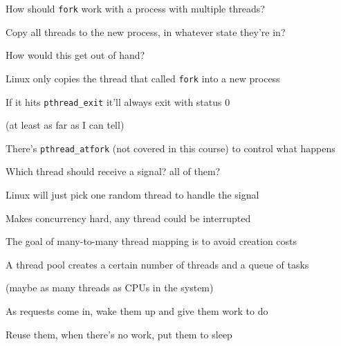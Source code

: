   \begin{slide}


    How should \texttt{fork} work with a process with multiple threads?

    \leftspace{}Copy all threads to the new process, in whatever state they're
    in?

    \leftspace{}\leftspace{}How would this get out of hand?
    \medskip

    Linux only copies the thread that called \texttt{fork} into a new process

    \leftspace{}If it hits \texttt{pthread\_exit} it'll always exit with
                  status 0

    \leftspace{}\leftspace{}(at least as far as I can tell)
    \medskip

    There's \texttt{pthread\_atfork} (not covered in this course) to control
    what happens

  \end{slide}

  \begin{slide}


    Which thread should receive a signal? all of them?
    \medskip

    Linux will just pick one random thread to handle the signal

    \leftspace{}Makes concurrency hard, any thread could be interrupted

  \end{slide}

  \begin{slide}


    The goal of many-to-many thread mapping is to avoid creation costs
    \medskip

    A thread pool creates a certain number of threads and a queue of tasks

    \leftspace{}(maybe as many threads as CPUs in the system)
    \medskip

    As requests come in, wake them up and give them work to do
    \medskip

    Reuse them, when there's no work, put them to sleep

  \end{slide}



